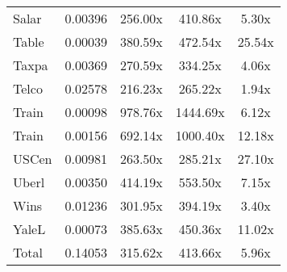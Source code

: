 \begin{table}
\begin{tabular}{|l|c|c|c|c|}
Salar & 0.00396 & 256.00x & 410.86x & 5.30x \\
Table & 0.00039 & 380.59x & 472.54x & 25.54x \\
Taxpa & 0.00369 & 270.59x & 334.25x & 4.06x \\
Telco & 0.02578 & 216.23x & 265.22x & 1.94x \\
Train & 0.00098 & 978.76x & 1444.69x & 6.12x \\
Train & 0.00156 & 692.14x & 1000.40x & 12.18x \\
USCen & 0.00981 & 263.50x & 285.21x & 27.10x \\
Uberl & 0.00350 & 414.19x & 553.50x & 7.15x \\
Wins & 0.01236 & 301.95x & 394.19x & 3.40x \\
YaleL & 0.00073 & 385.63x & 450.36x & 11.02x \\
Total & 0.14053 & 315.62x & 413.66x & 5.96x \\
\bottomrule
\end{tabular}
\end{table}
